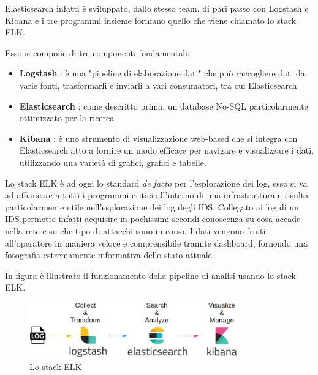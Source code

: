 \documentclass[12pt,a4paper,openright,twoside]{report}
\begin{document}
Elasticsearch infatti \`e sviluppato, dallo stesso team, di pari passo con Logstash
e Kibana e i tre programmi insieme formano quello che viene chiamato lo stack ELK.

Esso si compone di tre componenti fondamentali:
\begin{itemize}
  \item {\bf Logstash} : \`e una "pipeline di elaborazione dati" che pu\`o raccogliere
  dati da varie fonti, trasformarli e inviarli a vari consumatori, tra cui Elasticsearch
  \item {\bf Elasticsearch} : come descritto prima, un database No-SQL particolarmente ottimizzato per la
  ricerca
  \item {\bf Kibana} : \`e uno strumento di visualizzazione web-based che si integra
  con Elasticsearch atto a fornire un modo efficace per navigare e visualizzare i dati,
  utilizzando una variet\`a di grafici, grafici e tabelle.
\end{itemize}


Lo stack ELK \`e ad oggi lo standard {\it de facto} per l'esplorazione dei log,
esso si va ad affiancare a tutti i programmi critici all'interno di una infrastruttura
e risulta particolarmente utile nell'esplorazione dei log degli IDS. Collegato ai log di
un IDS permette infatti
acquisire in pochissimi secondi conoscenza su cosa accade nella rete e su che tipo di attacchi
sono in corso. I dati vengono fruiti all'operatore in maniera veloce e comprensibile tramite
dashboard, fornendo una fotografia estremamente informativa dello stato attuale.

In figura \`e illustrato il funzionamento della pipeline di analisi usando lo stack
ELK.

\begin{figure}
  \begin{center}                          %
    \includegraphics[width=90mm]{images/ELK-stack.png}
    \caption{Lo stack ELK}
    \label{}
  \end{center}
\end{figure}


\newpage

\clearpage{\pagestyle{empty}\cleardoublepage}
\end{document}
